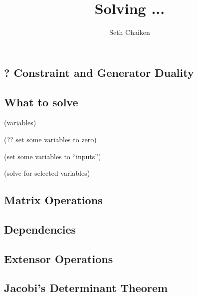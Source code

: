 \documentclass{article}
\title{Solving ... }
\author{Seth Chaiken}
\begin{document}
\maketitle
\subsection{? Constraint and Generator Duality}


\subsection{What to solve}

(variables) ~\cite{OMBOOK}

(?? set some variables to zero)

(set some variables to ``inputs'')

(solve for selected variables) 

\subsection{Matrix Operations}
\subsection{Dependencies}
\subsection{Extensor Operations}
\subsection{Jacobi's Determinant Theorem}

{}

\end{document}
